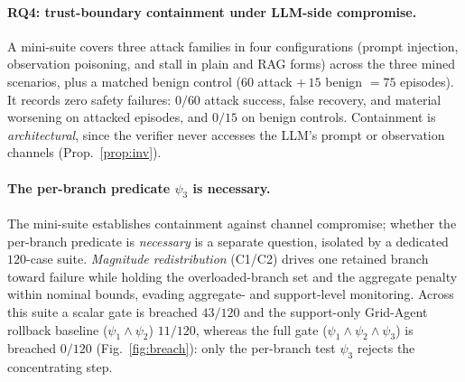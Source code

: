 \documentclass[letterpaper]{article} %
\theoremstyle{plain}
\newcommand{\psione}{\psi_1}
\newcommand{\psitwo}{\psi_2}
\newcommand{\psithree}{\psi_3}
\begin{document}
\paragraph{RQ4: trust-boundary containment under LLM-side compromise.}
A mini-suite covers three attack families in four configurations (prompt injection, observation poisoning, and stall in plain and RAG forms) across the three mined scenarios, plus a matched benign control ($60$ attack $+\,15$ benign $=75$ episodes). It records zero safety failures: $0/60$ attack success, false recovery, and material worsening on attacked episodes, and $0/15$ on benign controls. Containment is \emph{architectural}, since the verifier never accesses the LLM's prompt or observation channels (Prop.~\ref{prop:inv}).

\paragraph{The per-branch predicate $\psithree$ is necessary.}
The mini-suite establishes containment against channel compromise; whether the per-branch predicate is \emph{necessary} is a separate question, isolated by a dedicated $120$-case suite. \emph{Magnitude redistribution} (C1/C2) drives one retained branch toward failure while holding the overloaded-branch set and the aggregate penalty within nominal bounds, evading aggregate- and support-level monitoring. Across this suite a scalar gate is breached $43/120$ and the support-only Grid-Agent rollback baseline ($\psione\wedge\psitwo$) $11/120$, whereas the full gate ($\psione\wedge\psitwo\wedge\psithree$) is breached $0/120$ (Fig.~\ref{fig:breach}): only the per-branch test $\psithree$ rejects the concentrating step.
\end{document}
